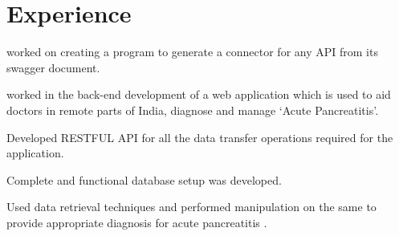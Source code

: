 \documentclass[]{deedy-resume-reversed}
\begin{document}
%
%

%
%

%
%

\begin{minipage}[t]{0.60\textwidth}


\section{Experience}
\vspace{\topsep} %
\begin{tightemize}
\item worked on creating a program to generate a connector for any API from its swagger document.
\end{tightemize}
\sectionsep


\begin{tightemize}
\item worked in the back-end development of a web application which is used to aid doctors in remote parts of India, diagnose and manage ‘Acute Pancreatitis’.
\item Developed RESTFUL API for all the data transfer operations required for the application. 
\item Complete and functional database setup was developed.
\item Used data retrieval techniques and performed manipulation on the same to provide appropriate diagnosis for acute pancreatitis .
\end{tightemize}
\sectionsep





\end{minipage}
\end{document}
